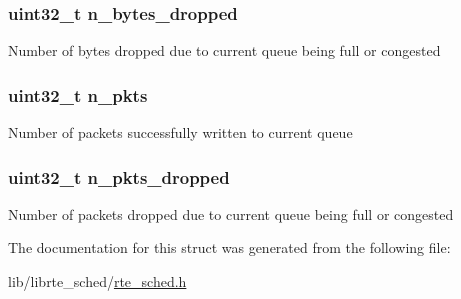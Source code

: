 \subsubsection[{n\+\_\+bytes\+\_\+dropped}]{\setlength{\rightskip}{0pt plus 5cm}uint32\+\_\+t n\+\_\+bytes\+\_\+dropped}\label{structrte__sched__queue__stats_a0db788b42c5d8e3d91004c334d99b3c7}
Number of bytes dropped due to current queue being full or congested \hypertarget{structrte__sched__queue__stats_aa1106014beffd6c6e35b34df746f0107}{}
\subsubsection[{n\+\_\+pkts}]{\setlength{\rightskip}{0pt plus 5cm}uint32\+\_\+t n\+\_\+pkts}\label{structrte__sched__queue__stats_aa1106014beffd6c6e35b34df746f0107}
Number of packets successfully written to current queue \hypertarget{structrte__sched__queue__stats_af527163bc22071756741d82093242f0a}{}
\subsubsection[{n\+\_\+pkts\+\_\+dropped}]{\setlength{\rightskip}{0pt plus 5cm}uint32\+\_\+t n\+\_\+pkts\+\_\+dropped}\label{structrte__sched__queue__stats_af527163bc22071756741d82093242f0a}
Number of packets dropped due to current queue being full or congested 

The documentation for this struct was generated from the following file\+:\begin{DoxyCompactItemize}
\item 
lib/librte\+\_\+sched/\hyperlink{rte__sched_8h}{rte\+\_\+sched.\+h}\end{DoxyCompactItemize}
